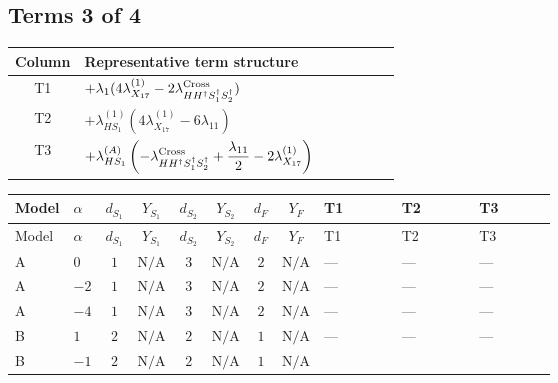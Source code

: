 \documentclass[8pt]{article}
\begin{document}
\begin{landscape}
\subsection*{Terms 3 of 4}
\begin{center}
\begin{tabular}{@{}c >{\raggedright\arraybackslash}p{0.82\linewidth}@{}}
\toprule
Column & Representative term structure \\
\midrule
T1 & \(\displaystyle +{\lambda_1} (4 {\lambda_{X_{17}}^{(1)}}-2 {\lambda_{H H^\dagger S_1^\dagger S_2^\dagger}^{\rm Cross}})\) \\
\midrule
T2 & \(\displaystyle +{\lambda_{HS_1}^{(1)}} (4 {\lambda_{X_{17}}^{(1)}}-6 {\lambda_{11}})\) \\
\midrule
T3 & \(\displaystyle +{\lambda_{HS_1}^{(A)}} \left(-{\lambda_{H H^\dagger S_1^\dagger S_2^\dagger}^{\rm Cross}}+\frac{{\lambda_{11}}}{2}-2 {\lambda_{X_{17}}^{(1)}}\right)\) \\
\midrule
\bottomrule
\end{tabular}
\end{center}
\smallskip
\tiny
\begin{longtable}{@{}llcccccc >{\raggedright\arraybackslash}p{0.21\linewidth} >{\raggedright\arraybackslash}p{0.21\linewidth} >{\raggedright\arraybackslash}p{0.21\linewidth}@{}}
\toprule
Model & $\alpha$ & $d_{S_1}$ & $Y_{S_1}$ & $d_{S_2}$ & $Y_{S_2}$ & $d_F$ & $Y_F$ & T1 & T2 & T3 \\
\midrule
\endfirsthead
\toprule
Model & $\alpha$ & $d_{S_1}$ & $Y_{S_1}$ & $d_{S_2}$ & $Y_{S_2}$ & $d_F$ & $Y_F$ & T1 & T2 & T3 \\
\midrule
\endhead
A & $0$ & $1$ & $\text{N/A}$ & $3$ & $\text{N/A}$ & $2$ & $\text{N/A}$ & --- & --- & --- \\
\midrule
A & $-2$ & $1$ & $\text{N/A}$ & $3$ & $\text{N/A}$ & $2$ & $\text{N/A}$ & --- & --- & --- \\
\midrule
A & $-4$ & $1$ & $\text{N/A}$ & $3$ & $\text{N/A}$ & $2$ & $\text{N/A}$ & --- & --- & --- \\
\midrule
B & $1$ & $2$ & $\text{N/A}$ & $2$ & $\text{N/A}$ & $1$ & $\text{N/A}$ & --- & --- & --- \\
\midrule
B & $-1$ & $2$ & $\text{N/A}$ & $2$ & $\text{N/A}$ & $1$ & $\text{N/A}$ & \scriptsize\adjustbox{max width=\linewidth}{$\begin{gathered} +{\lambda_1} (4 {\lambda_{X_{17}}^{(1)}}-2 {\lambda_{H H^\dagger S_1^\dagger S_2^\dagger}^{\rm Cross}})\end{gathered}$} & \scriptsize\adjustbox{max width=\linewidth}{$\begin{gathered} +{\lambda_{HS_1}^{(1)}} (4 {\lambda_{X_{17}}^{(1)}}-6 {\lambda_{11}})\end{gathered}$} & \scriptsize\adjustbox{max width=\linewidth}{$\begin{gathered} +{\lambda_{HS_1}^{(A)}} \left(-{\lambda_{H H^\dagger S_1^\dagger S_2^\dagger}^{\rm Cross}}+\frac{{\lambda_{11}}}{2}-2 {\lambda_{X_{17}}^{(1)}}\right)\end{gathered}$} \\

\end{longtable}
\end{landscape}
\end{document}
